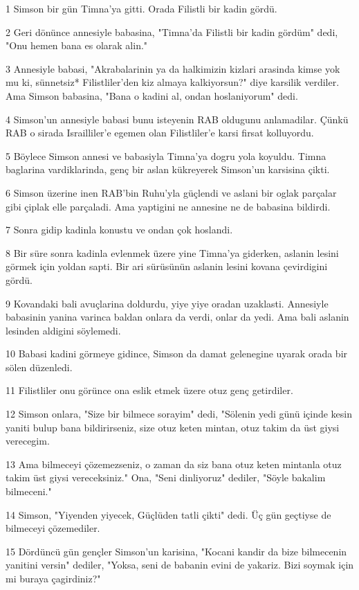 \par 1 Simson bir gün Timna'ya gitti. Orada Filistli bir kadin gördü.
\par 2 Geri dönünce annesiyle babasina, "Timna'da Filistli bir kadin gördüm" dedi, "Onu hemen bana es olarak alin."
\par 3 Annesiyle babasi, "Akrabalarinin ya da halkimizin kizlari arasinda kimse yok mu ki, sünnetsiz* Filistliler'den kiz almaya kalkiyorsun?" diye karsilik verdiler. Ama Simson babasina, "Bana o kadini al, ondan hoslaniyorum" dedi.
\par 4 Simson'un annesiyle babasi bunu isteyenin RAB oldugunu anlamadilar. Çünkü RAB o sirada Israilliler'e egemen olan Filistliler'e karsi firsat kolluyordu.
\par 5 Böylece Simson annesi ve babasiyla Timna'ya dogru yola koyuldu. Timna baglarina vardiklarinda, genç bir aslan kükreyerek Simson'un karsisina çikti.
\par 6 Simson üzerine inen RAB'bin Ruhu'yla güçlendi ve aslani bir oglak parçalar gibi çiplak elle parçaladi. Ama yaptigini ne annesine ne de babasina bildirdi.
\par 7 Sonra gidip kadinla konustu ve ondan çok hoslandi.
\par 8 Bir süre sonra kadinla evlenmek üzere yine Timna'ya giderken, aslanin lesini görmek için yoldan sapti. Bir ari sürüsünün aslanin lesini kovana çevirdigini gördü.
\par 9 Kovandaki bali avuçlarina doldurdu, yiye yiye oradan uzaklasti. Annesiyle babasinin yanina varinca baldan onlara da verdi, onlar da yedi. Ama bali aslanin lesinden aldigini söylemedi.
\par 10 Babasi kadini görmeye gidince, Simson da damat gelenegine uyarak orada bir sölen düzenledi.
\par 11 Filistliler onu görünce ona eslik etmek üzere otuz genç getirdiler.
\par 12 Simson onlara, "Size bir bilmece sorayim" dedi, "Sölenin yedi günü içinde kesin yaniti bulup bana bildirirseniz, size otuz keten mintan, otuz takim da üst giysi verecegim.
\par 13 Ama bilmeceyi çözemezseniz, o zaman da siz bana otuz keten mintanla otuz takim üst giysi vereceksiniz." Ona, "Seni dinliyoruz" dediler, "Söyle bakalim bilmeceni."
\par 14 Simson, "Yiyenden yiyecek, Güçlüden tatli çikti" dedi. Üç gün geçtiyse de bilmeceyi çözemediler.
\par 15 Dördüncü gün gençler Simson'un karisina, "Kocani kandir da bize bilmecenin yanitini versin" dediler, "Yoksa, seni de babanin evini de yakariz. Bizi soymak için mi buraya çagirdiniz?"
